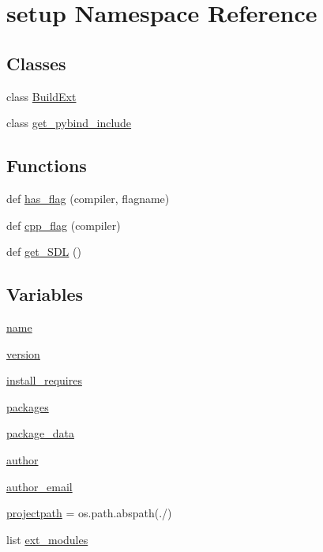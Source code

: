 \hypertarget{namespacesetup}{}\section{setup Namespace Reference}
\label{namespacesetup}
\subsection*{Classes}
\begin{DoxyCompactItemize}
\item 
class \hyperlink{classsetup_1_1_build_ext}{Build\+Ext}
\item 
class \hyperlink{classsetup_1_1get__pybind__include}{get\+\_\+pybind\+\_\+include}
\end{DoxyCompactItemize}
\subsection*{Functions}
\begin{DoxyCompactItemize}
\item 
def \hyperlink{namespacesetup_ade55a01ac6c42961312c9726c26033e4}{has\+\_\+flag} (compiler, flagname)
\item 
def \hyperlink{namespacesetup_ad2da0fef6ad12e5a9e5862390ff0f61a}{cpp\+\_\+flag} (compiler)
\item 
def \hyperlink{namespacesetup_a82542305ac5efdf22baf314a6cfc8788}{get\+\_\+\+S\+DL} ()
\end{DoxyCompactItemize}
\subsection*{Variables}
\begin{DoxyCompactItemize}
\item 
\hyperlink{namespacesetup_ab3a7a0638d76a01367c5bc3cc699447f}{name}
\item 
\hyperlink{namespacesetup_a2aa722b36a933088812b50ea79b97a5c}{version}
\item 
\hyperlink{namespacesetup_abead4f26b530856f858f0d44c7cf2588}{install\+\_\+requires}
\item 
\hyperlink{namespacesetup_aff2375a361fd5865c77bd9aa093be747}{packages}
\item 
\hyperlink{namespacesetup_a0a5ccc22976d20d42c6bb6c7651ce0be}{package\+\_\+data}
\item 
\hyperlink{namespacesetup_a3a57a4772d418a06835249cbade0d86a}{author}
\item 
\hyperlink{namespacesetup_a5b08034343aa2be607722a8b315f3625}{author\+\_\+email}
\item 
\hyperlink{namespacesetup_a739c3c68eac22e69247fde6ccb6a771a}{projectpath} = os.\+path.\+abspath(\textquotesingle{}./\textquotesingle{})
\item 
list \hyperlink{namespacesetup_a657516be9ed3c70ce05f5f6918206934}{ext\+\_\+modules}
\end{DoxyCompactItemize}


